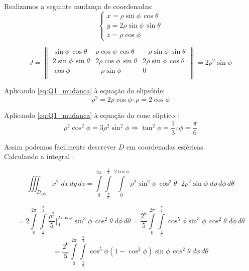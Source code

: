 \documentclass[12pt,a4paper]{article}
\begin{document}
Realizamos a seguinte mudança de coordenadas:
\begin{equation}
\left\{\begin{array}{ll}
x=\rho\sin\phi\,\cos\theta\\
y= 2\rho\sin\phi\,\sin\theta\\
z = \rho\cos\phi
\end{array}\right.
\label{eq:Q1_mudanca}
\end{equation}

\begin{equation}
J = \begin{Vmatrix}
\sin\phi\,\cos\theta &  \rho\cos\phi\,\cos\theta & -\rho\sin\phi\,\sin\theta \\
2\sin\phi\,\sin\theta & 2\rho\cos\phi\,\sin\theta & 2\rho\sin\phi\,\cos\theta \\
\cos\phi & -\rho\sin\phi & 0 \\
\end{Vmatrix} = 2\rho^2\sin\phi
\label{eq:Q1_Jac}
\end{equation}

Aplicando \eqref{eq:Q1_mudanca} \`a equaç\~{a}o do elipsóide:
\begin{equation}
\rho^2 = 2\rho\cos\phi \therefore \rho = 2\cos\phi
\label{eq:Q1_elipsoide}
\end{equation}

Aplicando \eqref{eq:Q1_mudanca} \`a equaç\~{a}o do cone elíptico :
\begin{equation}
\rho^2\cos^2\phi = 3 \rho^ 2 \sin^2\phi \Rightarrow \tan^2 \phi = \frac{1}{3} \therefore \phi = \frac{\pi}{6}
\label{eq:Q1_cone}
\end{equation}

Assim podemos facilmente descrever $D$ em coordenadas esf\'{e}ricas. \\

Calculando a integral : \

$$ \iiint_{D_{xyz}}{x^2}\;dx\,dy\,dz  = \int\limits_{0}^{2\pi} \int\limits_{\frac{\pi}{6}}^{\frac{\pi}{2}}  \int\limits_{0}^{2\cos\phi} \rho^2 \sin^2\phi\,\cos^2\theta \cdot 2 \rho^2 \sin\phi \;d\rho\, d\phi\,d\theta $$

$$ = 2\int\limits_{0}^{2\pi} \int\limits_{\frac{\pi}{6}}^{\frac{\pi}{2}}  \frac{\rho^5}{5} \Big|_{0}^{2\cos\phi} \sin^3\phi\,\cos^2\theta \;d\phi\,d\theta = \frac{2^6}{5} \int\limits_{0}^{2\pi} \int\limits_{\frac{\pi}{6}}^{\frac{\pi}{2}}  \cos^5\phi \sin^3\phi\,\cos^2\theta \;d\phi\,d\theta  $$
$$ = \frac{2^6}{5} \int\limits_{0}^{2\pi} \int\limits_{\frac{\pi}{6}}^{\frac{\pi}{2}}  \cos^5\phi (1 - \cos^2\phi) \sin\phi\,\cos^2\theta \;d\phi\,d\theta $$
\end{document}
